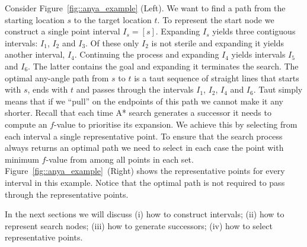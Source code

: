 \begin{example}
\label{ex::anya_example}
Consider Figure~\ref{fig::anya_example} (Left). 
We want to find a path from the starting location $s$ to the target location $t$.
To represent the start node we construct a single point interval $I_s = [s]$. 
Expanding $I_s$ yields three contiguous intervals: $I_1$, $I_2$ and $I_3$.
Of these only $I_2$ is not sterile and expanding it yields another interval, $I_4$.
Continuing the process and expanding $I_4$ yields intervals $I_5$ and $I_6$.
The latter contains the goal and expanding it terminates the search.
The optimal any-angle path from $s$ to $t$ is a taut sequence of 
straight lines that starts with $s$, ends with $t$ and passes through the intervals
$I_1$, $I_2$, $I_4$ and $I_6$. Taut simply means that if we ``pull'' on the endpoints
of this path we cannot make it any shorter.
Recall that each time A* search generates a successor it needs to compute an $f$-value
to prioritise its expansion. We achieve this by selecting from each interval a 
single representative point. To ensure that the search process always returns
an optimal path we need to select in each case the point with minimum $f$-value 
from among all points in each set. 
Figure~\ref{fig::anya_example}~(Right) shows the representative points
for every interval in this example.
Notice that the optimal path is not required to pass through the representative points.

\end{example} 

In the next sections we will discuss (i) how to construct intervals;
(ii) how to represent search nodes; (iii) how to generate successors; 
(iv) how to select representative points.

